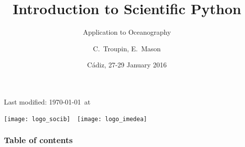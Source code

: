 
\parindent 0cm

\title[Scientific Python]{Introduction to Scientific Python}
\subtitle{Application to Oceanography}
\date[]{Cádiz, 27-29 January 2016}
\author{C.~Troupin, E.~Mason}



\begin{frame}
\centering

\footnotesize
\maketitle
{\scriptsize Last modified: \today\ at \currenttime}
\vfill



\texttt{[image: logo\_socib]}~~\texttt{[image: logo\_imedea]}


\end{frame}





\begin{frame}
\frametitle{Table of contents}
\end{frame}


% 
%
%
%


  



